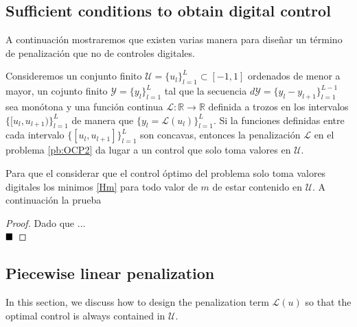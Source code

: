 \subsection{Sufficient conditions to obtain digital control}

A continuación mostraremos que existen varias manera para diseñar un término de penalización que no de controles digitales.
\newline
\begin{proposition}
    Consideremos un conjunto finito $\mathcal{U}=\{u_l\}_{l=1}^L \subset [-1,1] $ ordenados de menor a mayor, un cojunto finito $\mathcal{Y} = \{y_l\}_{l=1}^L$ tal que la  secuencia $d\mathcal{Y} = \{y_l - y_{l+1}\}_{l=1}^{L-1}$ sea monótona y una función continua $\mathcal{L}:\mathbb{R} \rightarrow \mathbb{R}$ definida a trozos en los intervalos $\{ [u_l,u_{l+1})\}_{l=1}^L$ de manera que $\{y_l = \mathcal{L}(u_l)\}_{l=1}^L$. Si la funciones definidas entre cada intervalo $\{[u_l,u_{l+1}]\}_{l=1}^L$ son concavas, entonces la penalización $\mathcal{L}$ en el problema \ref{pb:OCP2} da lugar a un control que solo toma valores en $\mathcal{U}$.
\end{proposition}
Para que el considerar que el control óptimo del problema solo toma valores digitales los minimos  \ref{Hm} para todo valor de $m$ de estar contenido en $\mathcal{U}$. A continuación la prueba
\newline

\begin{proof}
    Dado que ...\\
    $\hspace*{\fill}{\blacksquare}$
\end{proof}

\subsection{Piecewise linear penalization}

In this section, we discuss how to design the penalization term $\mathcal{L}(u)$ so that the optimal control is always contained in $\mathcal{U}$. 


